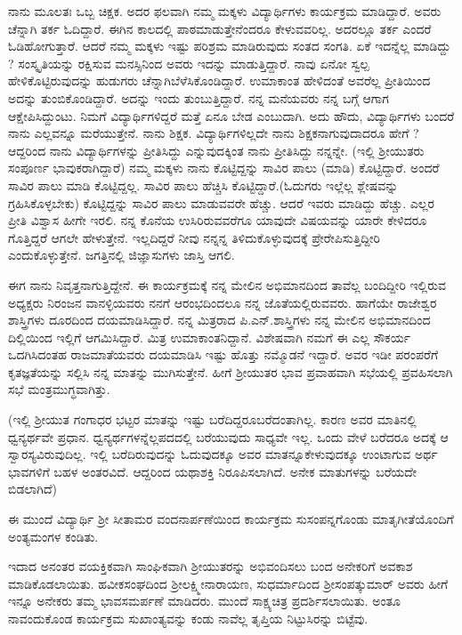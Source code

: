 {ನಾನು ಮೂಲತಃ ಒಬ್ಬ ಚಿಕ್ಷಕ. ಅದರ ಫಲವಾಗಿ ನಮ್ಮ ಮಕ್ಕಳು ವಿದ್ಯಾರ್ಥಿಗಳು ಕಾರ್ಯಕ್ರಮ ಮಾಡಿದ್ದಾರೆ. ಅವರು ಚೆನ್ನಾಗಿ ತರ್ಕ ಓದಿದ್ದಾರೆ. ಈಗಿನ ಕಾಲದಲ್ಲಿ ಪಾಠಮಾಡುತ್ತೇನೆಂದರೂ ಕೇಳುವವರಿಲ್ಲ. ಅದರಲ್ಲೂ ತರ್ಕ ಎಂದರೆ ಓಡಿಹೋಗು\-ತ್ತಾರೆ. ಆದರೆ ನಮ್ಮ ಮಕ್ಕಳು ಇಷ್ಟು ಪರಿಶ್ರಮ ಮಾಡಿರುವುದು ಸಂತದ ಸಂಗತಿ. ಏಕೆ ಇದನ್ನೆಲ್ಲ ಮಾಡಿದ್ದು ? ಸಂಸ್ಕೃತಿಯನ್ನು ರಕ್ಷಿಸುವ ಮನಸ್ಸಿನಿಂದ ಅವರು ಇದನ್ನು ಮಾಡುತ್ತಿದ್ದಾರೆ. ನಾವು ಏನೋ ಸ್ವಲ್ಪ ಹೇಳಿಕೊಟ್ಟಿರುವುದನ್ನು ಹುಡುಗರು ಚೆನ್ನಾಗಿ\break ಬೆಳೆಸಿಕೊಂಡಿದ್ದಾರೆ. ಉಮಾಕಾಂತ ಹೇಳಿದಂತೆ ಅವರೆಲ್ಲ ಪ್ರೀತಿಯಿಂದ ಅದನ್ನು ತುಂಬಿಕೊಂಡಿದ್ದಾರೆ. ಅದನ್ನು ಇಂದು ತುಂಬುತ್ತಿದ್ದಾರೆ. ನನ್ನ ಮನೆಯವರು ನನ್ನ ಬಗ್ಗೆ ಆಗಾಗ ಆಕ್ಷೇಪಿಸಿದ್ದುಂಟು. ನಿಮಗೆ ವಿದ್ಯಾರ್ಥಿಗಳಿದ್ದರೆ ಮತ್ತೆ ಏನೂ ಬೇಡ ಎಂಬುದಾಗಿ. ಅದು ಹೌದು, ವಿದ್ಯಾರ್ಥಿಗಳು ಬಂದರೆ ನಾನು ಎಲ್ಲವನ್ನೂ ಮರೆಯುತ್ತೇನೆ. ನಾನು ಶಿಕ್ಷಕ. ವಿದ್ಯಾರ್ಥಿಗಳಿಲ್ಲದೇ ನಾನು ಶಿಕ್ಷಕನಾಗುವುದಾದರೂ ಹೇಗೆ ? ಆದ್ದರಿಂದ ನಾನು ವಿದ್ಯಾರ್ಥಿಗಳನ್ನು ಪ್ರೀತಿಸಿದ್ದು ಎನ್ನುವುದಕ್ಕಿಂತ ನಾನು ಪ್ರೀತಿಸಿದ್ದು ನನ್ನನ್ನೇ. (ಇಲ್ಲಿ ಶ್ರೀಯುತರು ಸಂಪೂರ್ಣ ಭಾವುಕರಾಗಿದ್ದಾರೆ) ನಮ್ಮ ಮಕ್ಕಳು ನಾನು ಕೊಟ್ಟಿದ್ದನ್ನು ಸಾವಿರ ಪಾಲು (ಮಾಡಿ) ಕೊಟ್ಟಿದ್ದಾರೆ. ಅಂದರೆ ಸಾವಿರ ಪಾಲು ಮಾಡಿ \hbox{ಕೊಟ್ಟಿದ್ದಲ್ಲ}. ಸಾವಿರ ಪಾಲು ಹೆಚ್ಚಿಸಿ ಕೊಟ್ಟಿದ್ದಾರೆ.(ಓದುಗರು ಇಲ್ಲೆಲ್ಲ ಶ್ಲೇಷವನ್ನು ಗ್ರಹಿಸಿಕೊಳ್ಳ\-ಬೇಕು) ಕೊಟ್ಟಿದ್ದನ್ನು ಸಾವಿರ ಪಾಲು ಮಾಡುವವರೇ ಹೆಚ್ಚು. ಆದರೆ ಇವರು ಮಾಡಿದ್ದು ಹೆಚ್ಚು. ಎಲ್ಲರ ಪ್ರೀತಿ ವಿಶ್ವಾಸ ಹೀಗೇ ಇರಲಿ. ನನ್ನ ಕೊನೆಯ ಉಸಿರಿರುವ\-ವರೆಗೂ ಯಾವುದೇ ವಿಷಯವನ್ನು ಯಾರೇ ಕೇಳಿದರೂ ಗೊತ್ತಿದ್ದರೆ ಆಗಲೇ ಹೇಳುತ್ತೇನೆ. ಇಲ್ಲದಿದ್ದರೆ ನೀವು ನನ್ನನ್ನ ತಿಳಿದುಕೊಳ್ಳುವುದಕ್ಕೆ ಪ್ರೇರೇಪಿಸುತ್ತಿದ್ದೀರಿ ಎಂದುಕೊಳ್ಳುತ್ತೇನೆ. ಜಗತ್ತಿನಲ್ಲಿ ಜಿಜ್ಞಾಸುಗಳು ಜಾಸ್ತಿ ಆಗಲಿ. 
\vskip 4pt

ಈಗ ನಾನು ನಿವೃತ್ತನಾಗುತ್ತಿದ್ದೇನೆ. ಈ ಕಾರ್ಯಕ್ರಮಕ್ಕೆ ನನ್ನ ಮೇಲಿನ ಅಭಿಮಾನದಿಂದ ತಾವೆಲ್ಲ  ಬಂದಿದ್ದೀರಿ ಇಲ್ಲಿರುವ ಅಧ್ಯಕ್ಷರು ನಿರಂಜನ ವಾನಳ್ಳಿಯವರು ನನಗೆ ಆರಂಭದಿಂದಲೂ ನನ್ನ ಜೊತೆಯಲ್ಲಿರುವವರು. ಹಾಗೆಯೇ ರಾಜೇಶ್ವರ ಶಾಸ್ತ್ರಿಗಳು ದೂರದಿಂದ ದಯಮಾಡಿಸಿದ್ದಾರೆ. ನನ್ನ ಮಿತ್ರರಾದ ಪಿ.ಎನ್.ಶಾಸ್ತ್ರಿಗಳು ನನ್ನ ಮೇಲಿನ ಅಭಿಮಾನದಿಂದ ದಿಲ್ಲಿಯಿಂದ ಇಲ್ಲಿಗೆ ಆಗಮಿಸಿದ್ದಾರೆ. ಮಿತ್ರ ಉಮಾಕಾಂತನಿದ್ದಾನೆ. ವಿಶೇಷವಾಗಿ ನಮಗೆ ಈ ಎಲ್ಲ ಸೌಕರ್ಯ ಒದಗಿಸಿದಂತಹ ರಾಜಮಾತೆಯವರು ದಯಮಾಡಿಸಿ ಇಷ್ಟು ಹೊತ್ತು ನಮ್ಮೊಡನೆ ಇದ್ದಾರೆ. ಅವರ ಇಡೀ ಪರಂಪರೆಗೆ ಕೃತಜ್ಞತೆಯನ್ನು ಸಲ್ಲಿಸಿ ನನ್ನ ಮಾತನ್ನು ಮುಗಿಸುತ್ತೇನೆ. \enginline{-} ಹೀಗೆ ಶ್ರೀಯುತರ ಭಾವ ಪ್ರವಾಹವಾಗಿ ಸಭೆಯಲ್ಲಿ ಪ್ರವಹಿಸಲಾಗಿ ಸಭೆ ಮಂತ್ರಮುಗ್ಧವಾಗಿತ್ತು.
\vskip 4pt

(ಇಲ್ಲಿ ಶ್ರೀಯುತ ಗಂಗಾಧರ ಭಟ್ಟರ ಮಾತನ್ನು ಇಷ್ಟು ಬರೆದಿದ್ದರೂ\break ಬರೆದಂತಾಗಿಲ್ಲ. ಕಾರಣ ಅವರ ಮಾತಿನಲ್ಲಿ ಧ್ವನ್ಯರ್ಥವೇ ಪ್ರಧಾನ. ಧ್ವನ್ಯರ್ಥಗಳನ್ನೆಲ್ಲ\break ಪದದಲ್ಲಿ ಬರೆಯುವುದು ಸಾಧ್ಯವೇ ಇಲ್ಲ. ಒಂದು ವೇಳೆ ಬರೆದರೂ ಅದಕ್ಕೆ ಆ ಸ್ವಾರಸ್ಯ\-ವಿರುವುದಿಲ್ಲ. ಇಲ್ಲಿ ಬರೆದಿರುವುದನ್ನು ಓದುವುದಕ್ಕೂ ಅವರ ಮಾತನ್ನೂ\break ಕೇಳು\-ವುದಕ್ಕೂ ಉಂಟಾಗುವ ಅರ್ಥ ಭಾವಗಳಿಗೆ ಬಹಳ ಅಂತರವಿದೆ. ಆದ್ದರಿಂದ ಯಥಾಶಕ್ತಿ ನಿರೂಪಿಸಲಾಗಿದೆ. ಅನೇಕ ಮಾತುಗಳನ್ನು ಬರೆಯದೇ ಬಿಡಲಾಗಿದೆ)

ಈ ಮುಂದೆ ವಿದ್ಯಾರ್ಥಿ ಶ್ರೀ ಸೀತಾಮರ ವಂದನಾರ್ಪಣೆಯಿಂದ ಕಾರ್ಯಕ್ರಮ ಸುಸಂಪನ್ನಗೊಂಡು ಮಾತೃಗೀತೆಯೊಂದಿಗೆ ಅಂತ್ಯಮಂಗಳ ಕಂಡಿತು. 

ಇದಾದ ಅನಂತರ ವಯಕ್ತಿಕವಾಗಿ ಸಾಂಘಿಕವಾಗಿ ಶ್ರೀಯುತರನ್ನು ಅಭಿವಂದಿಸಲು ಬಂದ ಅನೇಕರಿಗೆ ಅವಕಾಶ ಮಾಡಿಕೊಡಲಾಯಿತು. ಹವೀಕಸಂಘದಿಂದ ಶ್ರೀಲಕ್ಷ್ಮೀ\-ನಾರಾಯಣ, ಸುಧರ್ಮಾದಿಂದ ಶ್ರೀಸಂಪತ್ಕುಮಾರ್ ಅವರು ಹೀಗೆ ಇನ್ನೂ ಅನೇಕರು ತಮ್ಮ ಭಾವಸಮರ್ಪಣೆ ಮಾಡಿದರು. ಮುಂದೆ ಸಾಕ್ಷ್ಯಚಿತ್ರ ಪ್ರದರ್ಶಿಸಲಾಯಿತು. ಅಂತೂ ನಾವಂದುಕೊಂಡ ಕಾರ್ಯಕ್ರಮ ಸುಖಾಂತ್ಯವನ್ನು ಕಂಡು ನಾವೆಲ್ಲ ತೃಪ್ತಿಯ ನಿಟ್ಟುಸಿರನ್ನು ಬಿಟ್ಟೆವು.

}
